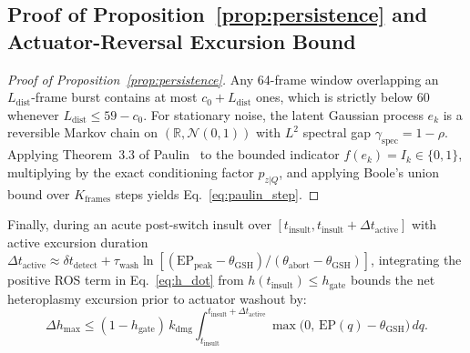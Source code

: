 \documentclass[11pt]{article}
\theoremstyle{plain}
\theoremstyle{remark}
\begin{document}
\subsection{Proof of Proposition~\ref{prop:persistence} and Actuator-Reversal Excursion Bound}
\label{app:persistence}
\begin{proof}[Proof of Proposition~\ref{prop:persistence}]
Any 64-frame window overlapping an $L_{\mathrm{dist}}$-frame burst contains at most $c_0 + L_{\mathrm{dist}}$ ones, which is strictly below $60$ whenever $L_{\mathrm{dist}} \le 59 - c_0$. For stationary noise, the latent Gaussian process $e_k$ is a reversible Markov chain on $(\mathbb{R}, \mathcal{N}(0,1))$ with $L^2$ spectral gap $\gamma_{\mathrm{spec}} = 1 - \rho$. Applying Theorem~3.3 of Paulin~\cite{paulin2015concentration} to the bounded indicator $f(e_k) = I_k \in \{0, 1\}$, multiplying by the exact conditioning factor $p_{z|Q}$, and applying Boole's union bound over $K_{\mathrm{frames}}$ steps yields Eq.~\eqref{eq:paulin_step}.
\end{proof}

Finally, during an acute post-switch insult over $[t_{\mathrm{insult}}, t_{\mathrm{insult}} + \Delta t_{\mathrm{active}}]$ with active excursion duration $\Delta t_{\mathrm{active}} \approx \delta t_{\mathrm{detect}} + \tau_{\mathrm{wash}}\ln[(\mathrm{EP}_{\mathrm{peak}} - \theta_{\mathrm{GSH}})/(\theta_{\mathrm{abort}} - \theta_{\mathrm{GSH}})]$, integrating the positive ROS term in Eq.~\eqref{eq:h_dot} from $h(t_{\mathrm{insult}}) \le h_{\mathrm{gate}}$ bounds the net heteroplasmy excursion prior to actuator washout by:
\begin{equation}
  \Delta h_{\max} \le (1 - h_{\mathrm{gate}})\,k_{\mathrm{dmg}}\int_{t_{\mathrm{insult}}}^{t_{\mathrm{insult}} + \Delta t_{\mathrm{active}}} \max\!\big(0,\, \mathrm{EP}(q) - \theta_{\mathrm{GSH}}\big)\,dq.
  \label{eq:rollback_excursion_bound}
\end{equation}
\end{document}
